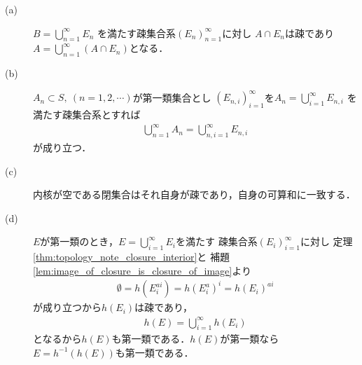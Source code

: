 	\begin{prf}\mbox{}
		\begin{description}
			\item[(a)] $B = \bigcup_{n=1}^\infty E_n$
				を満たす疎集合系$(E_n)_{n=1}^\infty$に対し
				$A \cap E_n$は疎であり$A = \bigcup_{n=1}^\infty (A \cap E_n)$となる．
			\item[(b)] $A_n \subset S,\ (n=1,2,\cdots)$が第一類集合とし
				$(E_{n,i})_{i=1}^\infty$を$A_n = \bigcup_{i=1}^\infty E_{n,i}$
				を満たす疎集合系とすれば
				\begin{align}
					\bigcup_{n=1}^\infty A_n
					= \bigcup_{n,i=1}^\infty E_{n,i}
				\end{align}
				が成り立つ．
				
			\item[(c)] 内核が空である閉集合はそれ自身が疎であり，自身の可算和に一致する．
			\item[(d)] $E$が第一類のとき，$E = \bigcup_{i=1}^\infty E_i$を満たす
				疎集合系$(E_i)_{i=1}^\infty$に対し
				定理\ref{thm:topology_note_closure_interior}と
				補題\ref{lem:image_of_closure_is_closure_of_image}より
				\begin{align}
					\emptyset = h(E_i^{ai})
					= h(E_i^a)^i
					= h(E_i)^{ai}
				\end{align}
				が成り立つから$h(E_i)$は疎であり，
				\begin{align}
					h(E) = \bigcup_{i=1}^\infty h(E_i)
				\end{align}
				となるから$h(E)$も第一類である．$h(E)$が第一類なら$E = h^{-1}(h(E))$も第一類である．
				\QED
		\end{description}
	\end{prf}